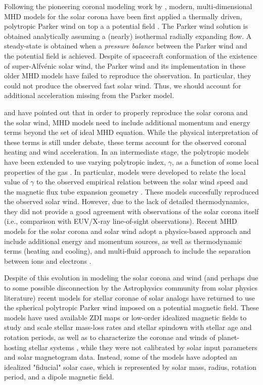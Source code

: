 \documentclass[apj]{emulateapj}
\begin{document}
Following the pioneering coronal modeling work by \cite{PneumanKopp71}, modern, multi-dimensional MHD models for the solar corona have been first applied a thermally driven, polytropic Parker wind \citep{Parker58} on top a a potential field \citep{Linker90,Usmanov93,LinkerMikic95}. The Parker wind solution is obtained analytically assuming a (nearly) isothermal radially expanding flow. A steady-state is obtained when a {\it pressure balance} between the Parker wind and the potential field is achieved. Despite of spacecraft conformation of the existence of super-Alfv\'enic solar wind, the Parker wind and its implementation in these older MHD models have failed to reproduce the observation. In particular, they could not produce the observed fast solar wind. Thus, we should account for additional acceleration missing from the Parker model.

\cite{Holzer77} and \cite{Usmanov00} have pointed out that in order to properly reproduce the solar corona and the solar wind, MHD models need to include additional momentum and energy terms beyond the set of ideal MHD equation. While the physical interpretation of these terms is still under debate, these terms account for the observed coronal heating and wind acceleration. In an intermediate stage, the polytropic models have been extended to use varying polytropic index, $\gamma$, as a function of some local properties of the gas \citep[e.g.,][]{Roussev03,Cohen07,Feng10,Jacobs11}. In particular, models were developed to relate the local value of $\gamma$ to the observed empirical relation between the solar wind speed and the magnetic flux tube expansion geometry \citep{WangSheeley90,McComas07}. These models succesfully reproduced the observed solar wind. However, due to the lack of detailed thermodynamics, they did not provide a good agreement with observations of the solar corona itself (i.e., comparison with EUV/X-ray line-of-sight observations). Recent MHD models for the solar corona and solar wind adopt a physics-based approach and include additional energy and momentum sources, as well as thermodynamic terms (heating and cooling), and multi-fluid approach to include the separation between ions and electrons \citep[e.g., most recent models by][]{Downs14,Lionello14,Vanderholst14,Usmanov16}. 

Despite of this evolution in modeling the solar corona and wind (and perhaps due to some possible disconnection by the Astrophysics community from solar physics literature) recent models for stellar coronae of solar analogs have returned to use the spherical polytropic Parker wind imposed on a potential magnetic field. These models have used available ZDI maps or low-order idealized magnetic fields to study and scale stellar mass-loss rates and stellar spindown with stellar age and rotation periods, as well as to characterize the coronae and winds of planet-hosting stellar systems \citep[e.g.,][]{Matt12,Vidotto14b,Matsakos15,Reville15,Strugarek15}, while they were not calibrated by solar input parameters and solar magnetogram data. Instead, some of the models have adopted an idealized "fiducial" solar case, which is represented by solar mass, radius, rotation period, and a dipole magnetic field.
\end{document}
